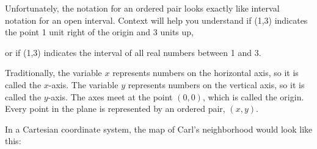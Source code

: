 \documentclass{ximera}
\begin{document}
\begin{remark}
Unfortunately, the notation for an ordered pair looks exactly like interval notation for an open interval. Context will help you understand if (1,3) indicates the point 1 unit right of the origin and 3 units up,

\begin{image}
\end{image}

 or if (1,3) indicates the interval of all real numbers between 1 and 3.

\begin{image}
\end{image}
\end{remark}

Traditionally, the variable $x$ represents numbers on the horizontal axis, so it is called the $x$-axis. The variable $y$ represents numbers on the vertical axis, so it is called the $y$-axis.  The axes meet at the point $(0,0)$, which is called the origin. Every point in the plane is represented by an ordered pair, $(x,y)$.  

In a Cartesian coordinate system, the map of Carl's neighborhood would look like this:

\begin{image}
\end{image}
\end{document}
